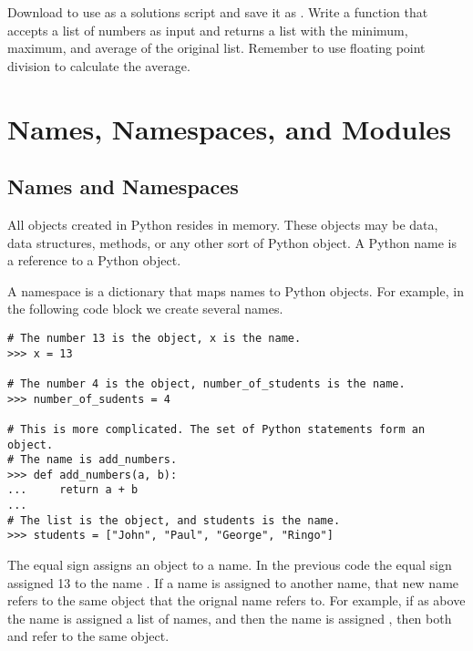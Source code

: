 \begin{problem}
Download  to use as a solutions script and save it as .
Write a function that accepts a list of numbers as input and returns a list with the minimum, maximum, and average of the original list.
Remember to use floating point division to calculate the average.
\end{problem}

\section*{Names, Namespaces, and Modules}

\subsection*{Names and Namespaces}
All objects created in Python resides in memory.
These objects may be data, data structures, methods, or any other sort of Python object.
A Python name is a reference to a Python object.

A namespace is a dictionary that maps names to Python objects.
For example, in the following code block we create several names.

\begin{lstlisting}
# The number 13 is the object, x is the name.
>>> x = 13

# The number 4 is the object, number_of_students is the name.
>>> number_of_sudents = 4

# This is more complicated. The set of Python statements form an object.
# The name is add_numbers.
>>> def add_numbers(a, b):
...     return a + b
... 
# The list is the object, and students is the name.
>>> students = ["John", "Paul", "George", "Ringo"]
\end{lstlisting}

The equal sign assigns an object to a name.
In the previous code the equal sign assigned 13 to the name .
If a name is assigned to another name, that new name refers to the same object that the orignal name refers to.
For example, if as above the name  is assigned a list of names, and then the name  is assigned , then both  and  refer to the same object.

